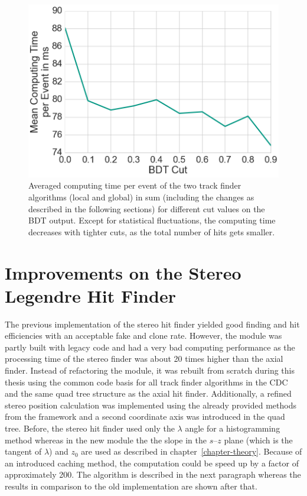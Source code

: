 \begin{figure}
  \centering
  \includegraphics[width=0.7\linewidth]{figures/workflow/background_hit_finder_performance.png}
  \caption{Averaged computing time per event of the two track finder algorithms (local and global) in sum (including the changes as described in the following sections) for different cut values on the BDT output. Except for statistical fluctuations, the computing time decreases with tighter cuts, as the total number of hits gets smaller.}
  \label{fig-performance-clusters}
\end{figure}

\section{Improvements on the Stereo Legendre Hit Finder} \label{section-stereo}

The previous implementation of the stereo hit finder yielded good finding and hit efficiencies with an acceptable fake and clone rate. However, the module was partly built with legacy code and had a very bad computing performance as the processing time of the stereo finder was about 20 times higher than the axial finder. Instead of refactoring the module, it was rebuilt from scratch during this thesis using the common code basis for all track finder algorithms in the CDC and the same quad tree structure as the axial hit finder. Additionally, a refined stereo position calculation was implemented using the already provided methods from the framework and a second coordinate axis was introduced in the quad tree. Before, the stereo hit finder used only the $\lambda$ angle for a histogramming method whereas in the new module the the slope in the $s$--$z$ plane (which is the tangent of $\lambda$) and $z_0$ are used as described in chapter~\ref{chapter-theory}. Because of an introduced caching method, the computation could be speed up by a factor of approximately 200. The algorithm is described in the next paragraph whereas the results in comparison to the old implementation are shown after that.

